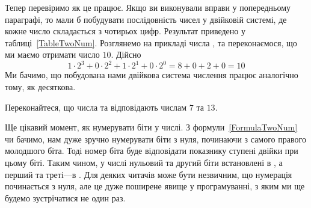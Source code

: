 
Тепер перевіримо як це працює.
Якщо ви виконували вправи у попередньому параграфі, то мали б побудувати послідовність чисел у двійковій системі, де кожне число складається з чотирьох цифр.
Результат приведено у таблиці~\ref{TableTwoNum}.
Розглянемо на прикладі числа , та переконаємося, що ми маємо отримати число $10$.
Дійсно $$ 1 \cdot 2^3 + 0 \cdot 2^2 + 1 \cdot 2^1 + 0 \cdot 2^0 = 8 + 0 + 2 + 0 = 10 $$
Ми бачимо, що побудована нами двійкова система числення працює аналогічно тому, як десяткова.

\begin{exercise}
Переконайтеся, що числа  та  відповідають числам $7$ та $13$.
\end{exercise}

Ще цікавий момент, як нумерувати біти у числі.
З формули~\ref{FormulaTwoNum} чи бачимо, нам дуже зручно нумерувати біти з нуля, починаючи з самого правого молодшого біта.
Тоді номер біта буде відповідати показнику ступені двійки при цьому біті.
Таким чином, у числі  нульовий та другий біти встановлені в , а перший та треті---в .
Для деяких читачів може бути незвичним, що нумерація починається з нуля, але це дуже поширене явище у програмуванні, з яким ми ще будемо зустрічатися не один раз.

